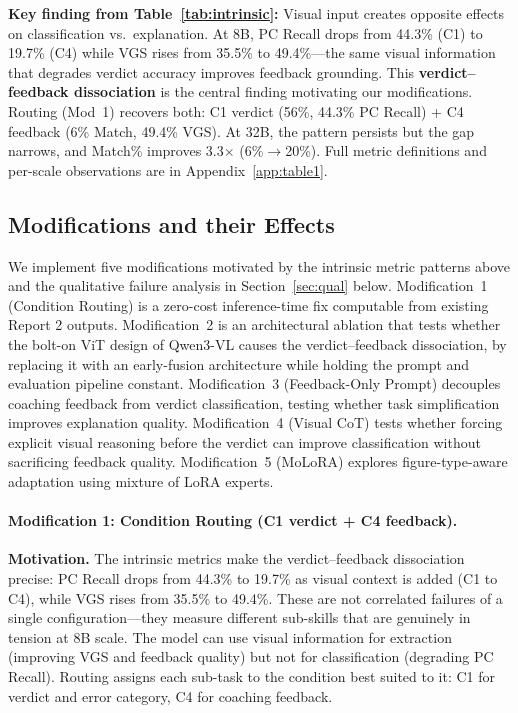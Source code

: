 \documentclass{article}
\begin{document}
\noindent\textbf{Key finding from Table~\ref{tab:intrinsic}:} Visual input creates
opposite effects on classification vs.\ explanation. At 8B, PC Recall drops from
44.3\% (C1) to 19.7\% (C4) while VGS rises from 35.5\% to 49.4\%---the same visual
information that degrades verdict accuracy improves feedback grounding. This
\textbf{verdict--feedback dissociation} is the central finding motivating our
modifications. Routing (Mod~1) recovers both: C1 verdict (56\%, 44.3\% PC Recall)
+ C4 feedback (6\% Match, 49.4\% VGS). At 32B, the pattern persists but the gap
narrows, and Match\% improves 3.3$\times$ (6\%$\to$20\%). Full metric definitions
and per-scale observations are in Appendix~\ref{app:table1}.

\subsection{Modifications and their Effects}

We implement five modifications motivated by the intrinsic metric patterns above
and the qualitative failure analysis in Section~\ref{sec:qual} below. Modification~1
(Condition Routing) is a zero-cost inference-time fix computable from existing Report 2
outputs. Modification~2 is an architectural ablation that tests whether the bolt-on
ViT design of Qwen3-VL causes the verdict--feedback dissociation, by replacing it
with an early-fusion architecture while holding the prompt and evaluation pipeline constant.
Modification~3 (Feedback-Only Prompt) decouples coaching feedback from verdict classification,
testing whether task simplification improves explanation quality.
Modification~4 (Visual CoT) tests whether forcing explicit visual reasoning before the
verdict can improve classification without sacrificing feedback quality.
Modification~5 (MoLoRA) explores figure-type-aware adaptation using mixture of LoRA experts.

\paragraph{Modification 1: Condition Routing (C1 verdict + C4 feedback).}

\textbf{Motivation.} The intrinsic metrics make the verdict--feedback dissociation
precise: PC Recall drops from 44.3\% to 19.7\% as visual context is added (C1 to
C4), while VGS rises from 35.5\% to 49.4\%. These are not correlated failures of
a single configuration---they measure different sub-skills that are genuinely in
tension at 8B scale. The model can use visual information for extraction (improving
VGS and feedback quality) but not for classification (degrading PC Recall). Routing
assigns each sub-task to the condition best suited to it: C1 for verdict and error
category, C4 for coaching feedback.
\end{document}
